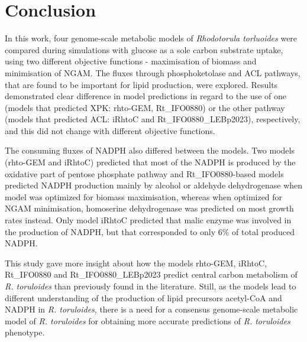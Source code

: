 \chapter{Conclusion}

In this work, four genome-scale metabolic models of \textit{Rhodotorula torluoides} were compared during simulations with glucose as a sole carbon substrate uptake, using two different objective functions - maximisation of biomass and minimisation of NGAM. The fluxes through phosphoketolase and ACL pathways, that are found to be important for lipid production, were explored. Results demonstrated clear difference in model predictions in regard to the use 
of one (models that predicted XPK: rhto-GEM, Rt\_IFO0880) or the other pathway (models that predicted ACL: iRhtoC and Rt\_IFO0880\_LEBp2023), respectively, and this did not change with different objective functions.

The consuming fluxes of NADPH also differed between the models. Two models (rhto-GEM and iRhtoC) predicted that most of the NADPH is produced by the oxidative part of pentose phosphate pathway and Rt\_IFO0880-based models predicted NADPH production mainly by alcohol or aldehyde dehydrogenase when model was optimized for biomass maximisation, whereas when optimized for NGAM minimisation, homoserine dehydrogenase was predicted on most growth rates instead. Only model iRhtoC predicted that malic enzyme was involved in the production of NADPH, but that corresponded to only 6\% of total produced NADPH.




This study gave more insight about how the models rhto-GEM, iRhtoC, Rt\_IFO0880 and Rt\_IFO0880\_LEBp2023 predict central carbon metabolism of \textit{R. toruloides} than previously found in the literature. Still, as the models lead to different understanding of the production of lipid precursors acetyl-CoA and NADPH in \textit{R. toruloides}, there is a need for a consensus genome-scale metabolic model of \textit{R. toruloides} for obtaining more accurate predictions of \textit{R. toruloides} phenotype.

